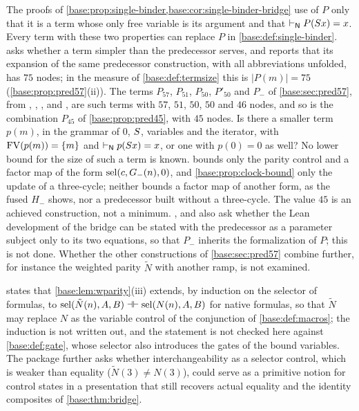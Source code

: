 \begin{question}
\label{base:q:single-binder-inverse}
The proofs of \cref{base:prop:single-binder,base:cor:single-binder-bridge}
use of $P$ only that it is a term whose only free variable is its argument
and that $\vdash_{\mathsf{N}}P(S x)=x$.  Every term with these two properties
can replace $P$ in \cref{base:def:single-binder}.   asks
whether a term simpler than the predecessor serves, and reports that its
expansion of the same predecessor construction, with all abbreviations
unfolded, has $75$ nodes; in the measure of \cref{base:def:termsize} this is
$|P(m)|=75$ (\cref{base:prop:pred57}(ii)).  The terms $P_{57}$, $P_{51}$,
$P_{50}$, $P'_{50}$ and $P_-$ of \cref{base:sec:pred57}, from
, ,
,  and , are
such terms with $57$, $51$, $50$, $50$ and $46$ nodes, and so is the
combination $P_{45}$ of \cref{base:prop:pred45}, with $45$ nodes.  Is there a smaller
term $p(m)$, in the grammar of $0$, $S$, variables and the iterator, with
$\operatorname{FV}(p(m))=\{m\}$ and $\vdash_{\mathsf{N}}p(S x)=x$, or one with $p(0)=0$ as
well?  No lower bound for the size of such a term is known.
 bounds only the parity control and a factor
map of the form $\operatorname{sel}(c,G_-(n),0)$, and \cref{base:prop:clock-bound} only the
update of a three-cycle; neither bounds a factor map of another form, as the
fused $H_-$ shows, nor a predecessor built without a three-cycle.  The value
$45$ is an achieved construction, not a minimum.  ,
 and  also ask whether the
Lean development of the bridge can be stated with the predecessor as a
parameter subject only to its two equations, so that $P_-$ inherits the
formalization of $P$; this is not done.  Whether the other constructions of
\cref{base:sec:pred57} combine further, for instance the weighted parity
$\tilde N$ with another ramp, is not examined.
\end{question}

\begin{question}
\label{base:q:wparity}
 states that \cref{base:lem:wparity}(iii) extends,
by induction on the selector of formulas, to
$\operatorname{sel}(\tilde N(n),A,B)\dashv\vdash\operatorname{sel}(N(n),A,B)$ for native formulas, so
that $\tilde N$ may replace $N$ as the variable control of the conjunction
of \cref{base:def:macros}; the induction is not written out, and the
statement is not checked here against \cref{base:def:gate}, whose selector
also introduces the gates of the bound variables.  The package further asks
whether interchangeability as a selector control, which is weaker than
equality ($\tilde N(3)\neq N(3)$), could serve as a primitive notion for
control states in a presentation that still recovers actual equality and
the identity composites of \cref{base:thm:bridge}.
\end{question}

